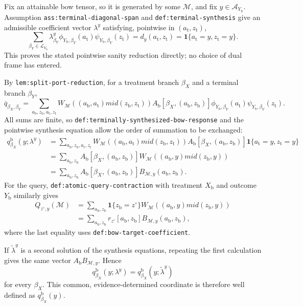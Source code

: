 Fix an attainable bow tensor, so it is generated by some \(\mathcal M\), and fix \(y\in\mathcal A_{Y_{\mathrm b}}\).  Assumption \texttt{ass:terminal-diagonal-span} and \texttt{def:terminal-synthesis} give an admissible coefficient vector \(\lambda^y\) satisfying, pointwise in \((a_{\mathrm t},z_{\mathrm t})\),
\[
 \sum_{\beta_Y\in\mathcal L_{Y_{\mathrm b}}}
 \lambda^y_{\beta_Y}\phi_{Y_{\mathrm b},\beta_Y}(a_{\mathrm t})
 \psi_{Y_{\mathrm b},\beta_Y}(z_{\mathrm t})
 =d_y(a_{\mathrm t},z_{\mathrm t})
 =\mathbf 1\{a_{\mathrm t}=y, z_{\mathrm t}=y\}.
\]
This proves the stated pointwise sanity reduction directly; no choice of dual frame has entered.

By \texttt{lem:split-port-reduction}, for a treatment branch \(\beta_X\) and a terminal branch \(\beta_Y\),
\[
 \bar q_{\beta_X,\beta_Y}
 =\sum_{a_{\mathrm b},z_{\mathrm b},a_{\mathrm t},z_{\mathrm t}}
 W_{\mathcal M}\!\left((a_{\mathrm b},a_{\mathrm t})mid
 (z_{\mathrm b},z_{\mathrm t})\right)
 A_{\mathrm b}[\beta_X,(a_{\mathrm b},z_{\mathrm b})]
 \phi_{Y_{\mathrm b},\beta_Y}(a_{\mathrm t})
 \psi_{Y_{\mathrm b},\beta_Y}(z_{\mathrm t}).
\]
All sums are finite, so \texttt{def:terminally-synthesized-bow-response} and the pointwise synthesis equation allow the order of summation to be exchanged:
\[
\begin{aligned}
 q^{\mathrm b}_{\beta_X}(y;\lambda^y)
 &=\sum_{a_{\mathrm b},z_{\mathrm b},a_{\mathrm t},z_{\mathrm t}}
 W_{\mathcal M}\!\left((a_{\mathrm b},a_{\mathrm t})mid
 (z_{\mathrm b},z_{\mathrm t})\right)
 A_{\mathrm b}[\beta_X,(a_{\mathrm b},z_{\mathrm b})]
 \mathbf 1\{a_{\mathrm t}=y, z_{\mathrm t}=y\}\\
 &=\sum_{a_{\mathrm b},z_{\mathrm b}}
 A_{\mathrm b}[\beta_X,(a_{\mathrm b},z_{\mathrm b})]
 W_{\mathcal M}\!\left((a_{\mathrm b},y)mid(z_{\mathrm b},y)\right)\\
 &=\sum_{a_{\mathrm b},z_{\mathrm b}}
 A_{\mathrm b}[\beta_X,(a_{\mathrm b},z_{\mathrm b})]
 B_{\mathcal M,y}(a_{\mathrm b},z_{\mathrm b}).
\end{aligned}
\]
For the query, \texttt{def:atomic-query-contraction} with treatment \(X_{\mathrm b}\) and outcome \(Y_{\mathrm b}\) similarly gives
\[
\begin{aligned}
 Q_{z^{\circ},y}(\mathcal M)
 &=\sum_{a_{\mathrm b},z_{\mathrm b}}
 \mathbf 1\{z_{\mathrm b}=z^{\circ}\}
 W_{\mathcal M}\!\left((a_{\mathrm b},y)mid(z_{\mathrm b},y)\right)\\
 &=\sum_{a_{\mathrm b},z_{\mathrm b}}
 r_{z^{\circ}}[a_{\mathrm b},z_{\mathrm b}]
 B_{\mathcal M,y}(a_{\mathrm b},z_{\mathrm b}),
\end{aligned}
\]
where the last equality uses \texttt{def:bow-target-coefficient}.

If \(\widetilde\lambda^y\) is a second solution of the synthesis equations, repeating the first calculation gives the same vector \(A_{\mathrm b}B_{\mathcal M,y}\).  Hence
\[
 q^{\mathrm b}_{\beta_X}(y;\lambda^y)
 =q^{\mathrm b}_{\beta_X}(y;\widetilde\lambda^y)
\]
for every \(\beta_X\).  This common, evidence-determined coordinate is therefore well defined as \(q^{\mathrm b}_{\beta_X}(y)\).